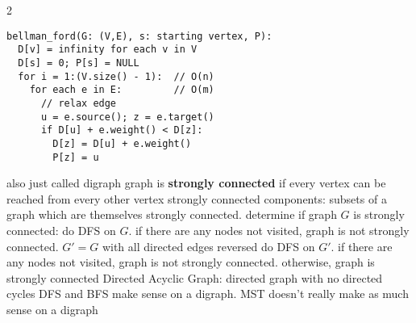 \documentclass{article}
\def \columncount {2}
\begin{document}
\begin{multicols*}{\columncount}
\begin{outline}[longenum]
\0 \vspace{-0.23cm}
\begin{lstlisting}
bellman_ford(G: (V,E), s: starting vertex, P):
  D[v] = infinity for each v in V
  D[s] = 0; P[s] = NULL
  for i = 1:(V.size() - 1):  // O(n)
    for each e in E:         // O(m)
      // relax edge
      u = e.source(); z = e.target()
      if D[u] + e.weight() < D[z]:
        D[z] = D[u] + e.weight()
        P[z] = u
\end{lstlisting} \vspace{-0.23cm}

  \1 also just called digraph
  \1 graph is \textbf{strongly connected} if every vertex can be reached from every other vertex
  \1 strongly connected components: subsets of a graph which are themselves strongly connected.
  \1 determine if graph $G$ is strongly connected:
    \2 do DFS on $G$. if there are any nodes not visited, graph is not strongly connected.
    \2 $G' = G$ with all directed edges reversed
    \2 do DFS on $G'$. if there are any nodes not visited, graph is not strongly connected.
    \2 otherwise, graph is strongly connected
  \1 Directed Acyclic Graph: directed graph with no directed cycles
  \1 DFS and BFS make sense on a digraph. MST doesn't really make as much sense on a digraph



\end{outline}
\end{multicols*}
\end{document}
